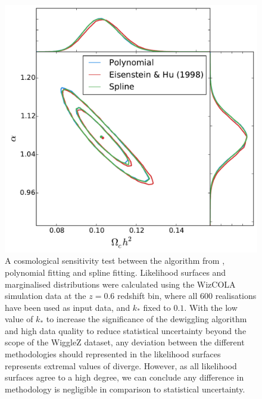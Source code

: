 \documentclass[iop,twocolappendix]{emulateapj}
\begin{document}
	
	\begin{figure}[t]
		\begin{center}
			\includegraphics[width=\columnwidth]{images/AcosmologyTest.pdf}
		\end{center}
		\caption{A cosmological sensitivity test between the algorithm from \citet{EisensteinHu1998}, polynomial fitting and spline fitting. Likelihood surfaces and marginalised distributions were calculated using the WizCOLA simulation data at the $z=0.6$ redshift bin, where all 600 realisations have been used as input data, and $k_*$ fixed to $0.1$. With the low value of $k_*$ to increase the significance of the dewiggling algorithm and high data quality to reduce statistical uncertainty beyond the scope of the WiggleZ dataset, any deviation between the different methodologies should represented in the likelihood surfaces represents extremal values of diverge. However, as all likelihood surfaces agree to a high degree, we can conclude any difference in methodology is negligible in comparison to statistical uncertainty.}
		\label{fig:AcosmologyTest}
	\end{figure}
	
	
	
\end{document}
